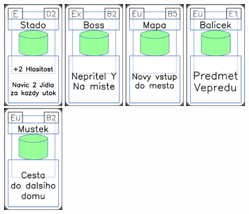 \documentclass[a4paper]{article}
\begin{document}
	\includegraphics[width=3.0cm]{img-4_46}
	\includegraphics[width=3.0cm]{img-4_6}
	\includegraphics[width=3.0cm]{img-4_39}
	\includegraphics[width=3.0cm]{img-4_20}
	\includegraphics[width=3.0cm]{img-4_36}
\end{document}
